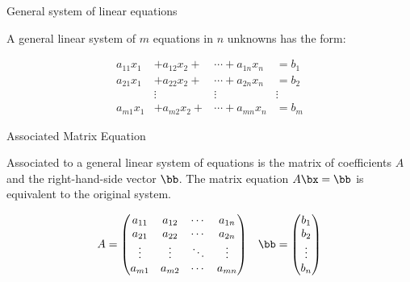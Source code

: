 \documentclass{beamer}
\begin{document}

\begin{frame}{General system of linear equations}

A general linear system of $m$ equations in $n$ unknowns has the form:

\begin{align*}
 a_{11}x_1 &+ a_{12}x_2 + &\cdots + a_{1n} x_n &= b_1\\
 a_{21}x_1 &+ a_{22}x_2 + &\cdots + a_{2n} x_n &= b_2\\
 \quad &{ \vdots \quad} \quad &{ \vdots \quad} \quad  &{ \vdots \quad} \quad\\
 a_{m1}x_1 &+ a_{m2}x_2 + &\cdots + a_{mn} x_n &= b_m
\end{align*}

\end{frame}


\begin{frame}{Associated Matrix Equation}

Associated to a general linear system of equations is the matrix of coefficients
$A$ and the right-hand-side vector $\bb$. The
matrix equation $A\bx = \bb$ is equivalent to the original system.

$$
\begin{matrix}
A =
\begin{pmatrix}
a_{11} & a_{12} & \cdots & a_{1n} \\
a_{21} & a_{22} & \cdots & a_{2n} \\
\vdots & \vdots & \ddots & \vdots \\
a_{m1} & a_{m2} & \cdots & a_{mn}
\end{pmatrix}
&
\bb =
\begin{pmatrix}
b_1 \\ b_2 \\ \vdots \\ b_n
\end{pmatrix}
\end{matrix}
$$


\end{frame}

\end{document}

